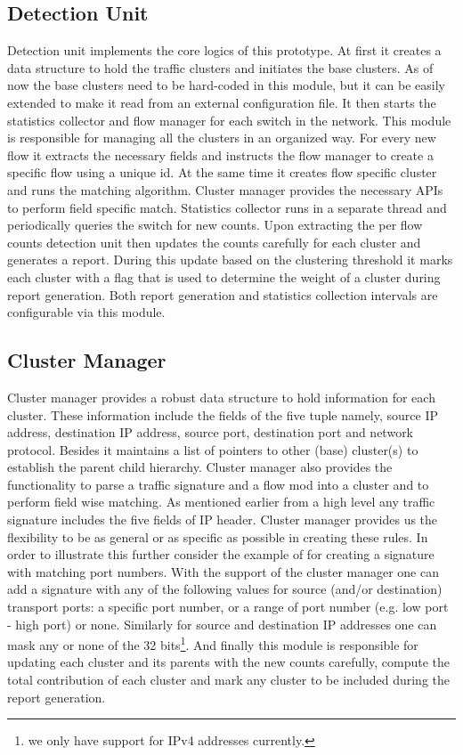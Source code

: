 \documentclass[twocolumn]{article}
\begin{document}
\subsection{Detection Unit}
Detection unit implements the core logics of this prototype. At first it creates a data structure to hold the traffic clusters and initiates the base clusters. As of now the base clusters need to be hard-coded in this module, but it can be easily extended to make it read from an external configuration file. It then starts the statistics collector and flow manager for each switch in the network. This module is responsible for managing all the clusters in an organized way. For every new flow it extracts the necessary fields and instructs the flow manager to create a specific flow using a unique id. At the same time it creates flow specific cluster and runs the matching algorithm. Cluster manager provides the necessary APIs to perform field specific match. Statistics collector runs in a separate thread and periodically queries the switch for new counts. Upon extracting the per flow counts detection unit then updates the counts carefully for each cluster and generates a report. During this update based on the clustering threshold it marks each cluster with a flag that is used to determine the weight of a cluster during report generation. Both report generation and statistics collection intervals are configurable via this module. 

\subsection{Cluster Manager}
Cluster manager provides a robust data structure to hold information for each cluster. These information include the fields of the five tuple namely, source IP address, destination IP address, source port, destination port and network protocol. Besides it maintains a list of pointers to  other (base) cluster(s) to establish the parent child hierarchy. Cluster manager also provides the functionality to parse a traffic signature and a flow mod into a cluster and to perform field wise matching. As mentioned earlier from a high level any traffic signature includes the five fields of IP header. Cluster manager provides us the flexibility to be as general or as specific as possible in creating these rules. In order to illustrate this further consider the example of for creating a signature with matching port numbers. With the support of the cluster manager one can add a signature with any of the following values for source (and/or destination) transport ports: a specific port number, or a range of port number (e.g. low port - high port) or none. Similarly for source and destination IP addresses one can mask any or none of the 32 bits\footnote{we only have support for IPv4 addresses currently.}. And finally this module is responsible for updating each cluster and its parents with the new counts carefully, compute the total contribution of each cluster and mark any cluster to be included during the report generation.
\end{document}
